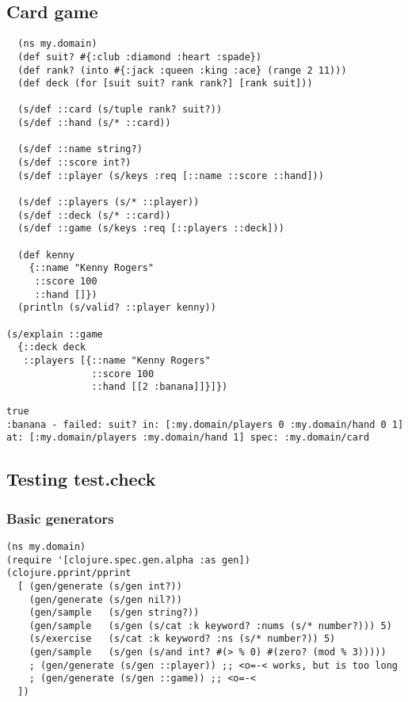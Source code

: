 \documentclass[10pt,oneside,x11names]{article}
\begin{document}
\subsection{Card game}
\label{sec:orgb7a386a}

\begin{verbatim}
  (ns my.domain)
  (def suit? #{:club :diamond :heart :spade})
  (def rank? (into #{:jack :queen :king :ace} (range 2 11)))
  (def deck (for [suit suit? rank rank?] [rank suit]))

  (s/def ::card (s/tuple rank? suit?))
  (s/def ::hand (s/* ::card))

  (s/def ::name string?)
  (s/def ::score int?)
  (s/def ::player (s/keys :req [::name ::score ::hand]))

  (s/def ::players (s/* ::player))
  (s/def ::deck (s/* ::card))
  (s/def ::game (s/keys :req [::players ::deck]))

  (def kenny
    {::name "Kenny Rogers"
     ::score 100
     ::hand []})
  (println (s/valid? ::player kenny))

(s/explain ::game
  {::deck deck
   ::players [{::name "Kenny Rogers"
               ::score 100
               ::hand [[2 :banana]]}]})
\end{verbatim}

\begin{verbatim}
true
:banana - failed: suit? in: [:my.domain/players 0 :my.domain/hand 0 1] at: [:my.domain/players :my.domain/hand 1] spec: :my.domain/card
\end{verbatim}

\subsection{Testing test.check}
\label{sec:org76ad4ce}
\subsubsection{Basic generators}
\label{sec:orgca85165}

\begin{verbatim}
(ns my.domain)
(require '[clojure.spec.gen.alpha :as gen])
(clojure.pprint/pprint
  [ (gen/generate (s/gen int?))
    (gen/generate (s/gen nil?))
    (gen/sample   (s/gen string?))
    (gen/sample   (s/gen (s/cat :k keyword? :nums (s/* number?))) 5)
    (s/exercise   (s/cat :k keyword? :ns (s/* number?)) 5)
    (gen/sample   (s/gen (s/and int? #(> % 0) #(zero? (mod % 3)))))
    ; (gen/generate (s/gen ::player)) ;; <o=-< works, but is too long
    ; (gen/generate (s/gen ::game)) ;; <o=-<
  ])
\end{verbatim}
\end{document}
